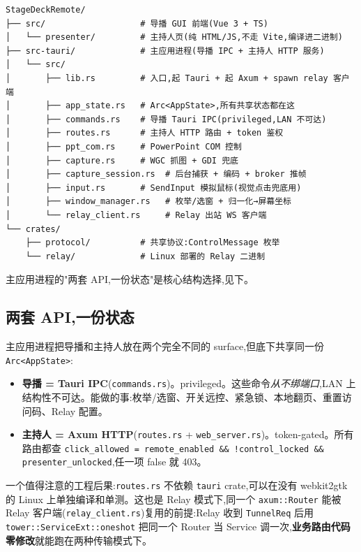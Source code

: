 \begin{lstlisting}
StageDeckRemote/
├── src/                   # 导播 GUI 前端(Vue 3 + TS)
│   └── presenter/         # 主持人页(纯 HTML/JS,不走 Vite,编译进二进制)
├── src-tauri/             # 主应用进程(导播 IPC + 主持人 HTTP 服务)
│   └── src/
│       ├── lib.rs         # 入口,起 Tauri + 起 Axum + spawn relay 客户端
│       ├── app_state.rs   # Arc<AppState>,所有共享状态都在这
│       ├── commands.rs    # 导播 Tauri IPC(privileged,LAN 不可达)
│       ├── routes.rs      # 主持人 HTTP 路由 + token 鉴权
│       ├── ppt_com.rs     # PowerPoint COM 控制
│       ├── capture.rs     # WGC 抓图 + GDI 兜底
│       ├── capture_session.rs  # 后台捕获 + 编码 + broker 推帧
│       ├── input.rs       # SendInput 模拟鼠标(视觉点击兜底用)
│       ├── window_manager.rs   # 枚举/选窗 + 归一化→屏幕坐标
│       └── relay_client.rs     # Relay 出站 WS 客户端
└── crates/
    ├── protocol/          # 共享协议:ControlMessage 枚举
    └── relay/             # Linux 部署的 Relay 二进制
\end{lstlisting}

主应用进程的"两套 API,一份状态"是核心结构选择,见下。

\subsection{两套 API,一份状态}

主应用进程把导播和主持人放在两个完全不同的 surface,但底下共享同一份 \texttt{Arc<AppState>}:

\begin{itemize}
  \item \textbf{导播 = Tauri IPC}(\texttt{commands.rs})。privileged。这些命令\textit{从不绑端口},LAN 上结构性不可达。能做的事:枚举/选窗、开关远控、紧急锁、本地翻页、重置访问码、Relay 配置。
  \item \textbf{主持人 = Axum HTTP}(\texttt{routes.rs} + \texttt{web\_server.rs})。token-gated。所有路由都查 \texttt{click\_allowed = remote\_enabled \&\& !control\_locked \&\& presenter\_unlocked},任一项 false 就 403。
\end{itemize}

一个值得注意的工程后果:\texttt{routes.rs} 不依赖 \texttt{tauri} crate,可以在没有 webkit2gtk 的 Linux 上单独编译和单测。这也是 Relay 模式下,同一个 \texttt{axum::Router} 能被 Relay 客户端(\texttt{relay\_client.rs})复用的前提:Relay 收到 \texttt{TunnelReq} 后用 \texttt{tower::ServiceExt::oneshot} 把同一个 Router 当 Service 调一次,\textbf{业务路由代码零修改}就能跑在两种传输模式下。

